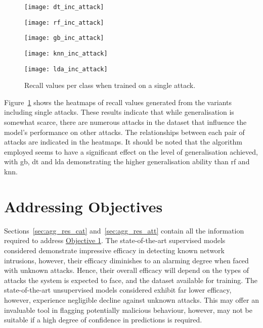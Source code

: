 \begin{figure}[htbp]
    \centering
    \begin{minipage}[h]{0.5\textwidth}
        \centering
        \texttt{[image: dt\_inc\_attack]}
    \end{minipage}\hfill
    \begin{minipage}[h]{0.5\textwidth}
        \centering
        \texttt{[image: rf\_inc\_attack]}
    \end{minipage}
    \begin{minipage}[h]{0.5\textwidth}
        \centering
        \texttt{[image: gb\_inc\_attack]}
    \end{minipage}\hfill
    \begin{minipage}[h]{0.5\textwidth}
        \centering
        \texttt{[image: knn\_inc\_attack]}
    \end{minipage}
    \begin{minipage}[h]{0.5\textwidth}
        \centering
        \texttt{[image: lda\_inc\_attack]}
    \end{minipage}
    \caption[Single Individual Attack Results]{Recall values per class when trained on a single attack.\label{fig:inc_att}}
\end{figure}
%

Figure~\ref{fig:inc_att} shows the heatmaps of recall values generated from the
variants including single attacks. These results indicate that while
generalisation is somewhat scarce, there are numerous attacks in the dataset
that influence the model's performance on other attacks. The relationships
between each pair of attacks are indicated in the heatmaps. It should be noted
that the algorithm employed seems to have a significant effect on the level of
generalisation achieved, with \gls{gb}, \gls{dt} and \gls{lda} demonstrating
the higher generalisation ability than \gls{rf} and \gls{knn}.

\section{Addressing Objectives}%
\label{sec:add_obj}

Sections~\ref{sec:agg_res_cat} and~\ref{sec:agg_res_att} contain all the
information required to address \hyperlink{obj}{Objective 1}. The
state-of-the-art supervised models considered demonstrate impressive efficacy
in detecting known network intrusions, however, their efficacy diminishes to an
alarming degree when faced with unknown attacks. Hence, their overall efficacy
will depend on the types of attacks the system is expected to face, and the
dataset available for training. The state-of-the-art unsupervised models
considered exhibit far lower efficacy, however, experience negligible decline
against unknown attacks. This may offer an invaluable tool in flagging
potentially malicious behaviour, however, may not be suitable if a high degree
of confidence in predictions is required.

